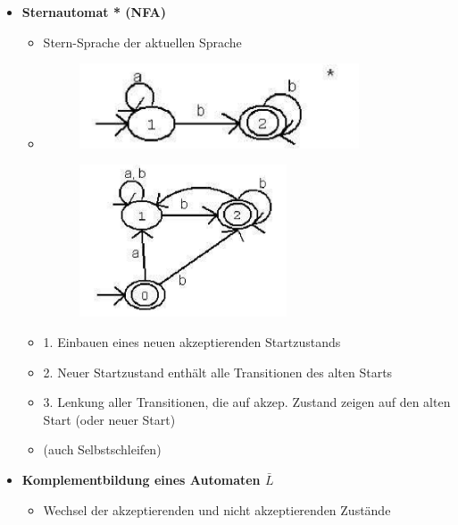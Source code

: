 \documentclass[11pt,a4paper]{article}
\begin{document}
\begin{itemize}
\begin{itemize}
	\end{itemize}
	
\pagebreak
	
\item {\large \textbf{Sternautomat * (NFA)}}
	\begin{itemize}
	
	\item Stern-Sprache der aktuellen Sprache	
	
	\item[]
		\begin{minipage}{0.45\textwidth}
				\begin{figure}[H]
				\includegraphics[height=2.5cm]{stern1}
				\end{figure}
			\end{minipage}
			\begin{minipage}[t]{0.45\textwidth}
				\vspace{-1.75cm}
				\begin{figure}[H]
				\includegraphics[height=4.5cm]{stern2}
				\end{figure}
			\end{minipage}
	
	\item 1. Einbauen eines neuen akzeptierenden Startzustands
	\item 2. Neuer Startzustand enthält alle Transitionen des alten Starts
	\item 3. Lenkung aller Transitionen, die auf akzep. Zustand zeigen auf den alten Start (oder neuer Start)
	\item (auch Selbstschleifen)
	
	\end{itemize}
	
	
\item {\large \textbf{Komplementbildung eines Automaten $\bar{L}$}}
	\begin{itemize}
	\item Wechsel der akzeptierenden und nicht akzeptierenden Zustände
	\end{itemize}
		

\end{itemize}
\end{document}
